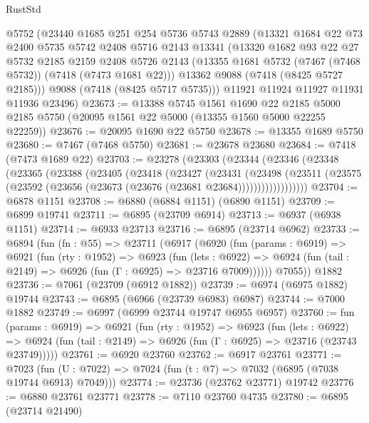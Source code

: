 \begin{lexlean}{RustStd}
\begin{coremodule}
    @5752
    (@23440
      @1685
      @251
      @254
      @5736
      @5743
      @2889
      (@13321
        @1684
        @22
        @73
        @2400
        @5735
        @5742
        @2408
        @5716
        @2143
        @13341
        (@13320
          @1682
          @93
          @22
          @27
          @5732
          @2185
          @2159
          @2408
          @5726
          @2143
          (@13355 @1681 @5732 (@7467 (@7468 @5732)) (@7418 (@7473 @1681 @22)))
          @13362
          @9088
          (@7418 (@8425 @5727 @2185)))
        @9088
        (@7418 (@8425 @5717 @5735)))
      @11921
      @11924
      @11927
      @11931
      @11936
      @23496)
@23673 := @13388
    @5745
    @1561
    @1690
    @22
    @2185
    @5000
    @2185
    @5750
    (@20095 @1561 @22 @5000 (@13355 @1560 @5000 @22255 @22259))
@23676 := @20095 @1690 @22 @5750
@23678 := @13355 @1689 @5750
@23680 := @7467 (@7468 @5750)
@23681 := @23678 @23680
@23684 := @7418 (@7473 @1689 @22)
@23703 := @23278
    (@23303
      (@23344
        (@23346
          (@23348
            (@23365
              (@23388
                (@23405
                  (@23418
                    (@23427
                      (@23431
                        (@23498
                          (@23511
                            (@23575 (@23592 (@23656 (@23673 (@23676 (@23681 @23684))))))))))))))))))
@23704 := @6878 @1151
@23708 := @6880 (@6884 @1151) (@6890 @1151)
@23709 := @6899 @19741
@23711 := @6895 (@23709 @6914)
@23713 := @6937 (@6938 @1151)
@23714 := @6933 @23713
@23716 := @6895 (@23714 @6962)
@23733 := @6894
    (fun (fn : @55) =>
    @23711
      (@6917
        (@6920
          (fun (params : @6919) =>
          @6921
            (fun (rty : @1952) =>
            @6923
              (fun (lets : @6922) =>
              @6924 (fun (tail : @2149) => @6926 (fun (Γ : @6925) => @23716 @7009))))))
        @7055))
    @1882
@23736 := @7061 (@23709 (@6912 @1882))
@23739 := @6974 (@6975 @1882) @19744
@23743 := @6895 (@6966 (@23739 @6983) @6987)
@23744 := @7000 @1882
@23749 := @6997 (@6999 @23744 @19747 @6955 @6957)
@23760 := fun (params : @6919) =>
  @6921
    (fun (rty : @1952) =>
    @6923
      (fun (lets : @6922) =>
      @6924 (fun (tail : @2149) => @6926 (fun (Γ : @6925) => @23716 (@23743 @23749)))))
@23761 := @6920 @23760
@23762 := @6917 @23761
@23771 := @7023
    (fun (U : @7022) => @7024 (fun (t : @7) => @7032 (@6895 (@7038 @19744 @6913) @7049)))
@23774 := @23736 (@23762 @23771) @19742
@23776 := @6880 @23761 @23771
@23778 := @7110 @23760 @4735
@23780 := @6895 (@23714 @21490)

\end{coremodule}
\end{lexlean}
